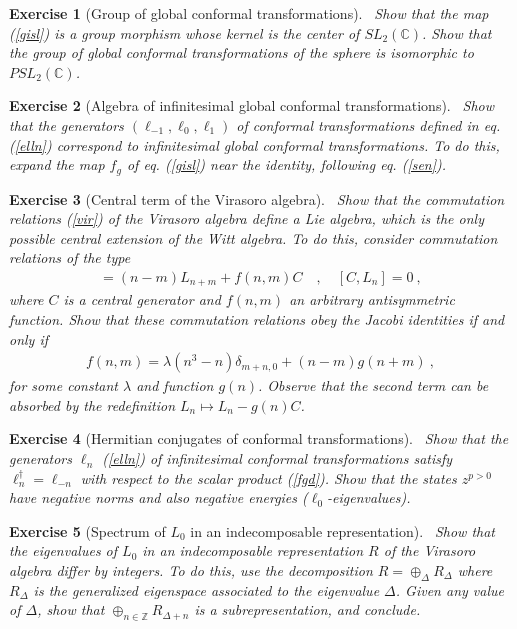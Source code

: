 \documentclass[12pt,a4paper,notitlepage]{report}
\newcommand \Z {\mathbb{Z}}
\newcommand \C {\mathbb{C}}
\numberwithin{equation}{section}
\theoremstyle{break}
\newtheorem{exo}{Exercise}[chapter]
\begin{document}
\begin{exo}[Group of global conformal transformations]
 ~\label{exoiso}
Show that the map (\ref{gisl}) is a group morphism whose kernel is the center of $SL_2(\C)$. Show that the group of global conformal transformations of the sphere is isomorphic to $PSL_2(\C)$. 
\end{exo}

\begin{exo}[Algebra of infinitesimal global conformal transformations]
 ~\label{exomoz}
Show that the generators $(\ell_{-1},\ell_0,\ell_1)$ of conformal transformations defined in eq. (\ref{elln}) correspond to infinitesimal global conformal transformations. To do this, expand the map $f_g$ of eq. (\ref{gisl}) near the identity, following eq. (\ref{sen}).
\end{exo}


\begin{exo}[Central term of the Virasoro algebra]
~\label{exovir}
 Show that the commutation relations (\ref{vir}) of the Virasoro algebra define a Lie algebra, which is the only possible central extension of the Witt algebra. To do this, consider commutation relations of the type
\begin{align}
 [L_n,L_m] =(n-m)L_{n+m} + f(n,m) C  \quad , \quad [C,L_n]=0\ ,
\end{align}
where $C$ is a central generator and $f(n,m)$ an arbitrary antisymmetric function. Show that these commutation relations obey the Jacobi identities if and only if 
\begin{align}
 f(n,m) = \lambda (n^3-n)\delta_{m+n,0} + (n-m)g(n+m)\ ,
\end{align}
for some constant $\lambda$ and function $g(n)$. Observe that the second term can be absorbed by the redefinition $L_n\mapsto L_n-g(n)C$.
\end{exo}

\begin{exo}[Hermitian conjugates of conformal transformations]
 ~\label{exolnd}
Show that the generators $\ell_n$ (\ref{elln}) of infinitesimal conformal transformations satisfy $\ell_n^\dagger =\ell_{-n}$ with respect to the scalar product (\ref{fgd}). Show that the states $z^{p>0}$ have negative norms and also negative energies ($\ell_0$-eigenvalues). 
\end{exo}

\begin{exo}[Spectrum of $L_0$ in an indecomposable representation]
 ~\label{exodiffint}
Show that the eigenvalues of $L_0$ in an indecomposable representation $R$ of the Virasoro algebra differ by integers. To do this, use the decomposition $R=\oplus_\Delta R_\Delta$ where $R_\Delta$ is the generalized eigenspace associated to the eigenvalue $\Delta$. Given any value of $\Delta$, show that  $\oplus_{n\in\Z} R_{\Delta+n}$ is a subrepresentation, and conclude. 
\end{exo}
\end{document}
